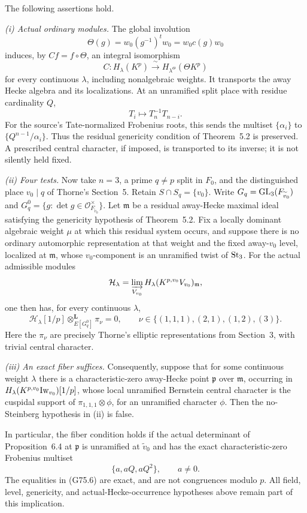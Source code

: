 \begin{theorem}
\label{thm:G75}
The following assertions hold.

\emph{(i) Actual ordinary modules.}
The global involution
\[
 \Theta(g)=w_0(g^{-1})^t w_0=w_0c(g)w_0
 \tag{G75.2}
\]
induces, by \(Cf=f\circ\Theta\), an integral isomorphism
\[
 C:H_\lambda(K^p)\xrightarrow{\ \sim\ }
                H_{\lambda^\Theta}(\Theta K^p)
 \tag{G75.3}
\]
for every continuous \(\lambda\), including nonalgebraic weights.
It transports the away Hecke algebra and its localizations.
At an unramified split place with residue cardinality \(Q\),
\[
 T_i\longmapsto T_n^{-1}T_{n-i}.
 \tag{G75.4}
\]
For the source's Tate-normalized Frobenius roots, this sends the multiset
\(\{\alpha_i\}\) to \(\{Q^{n-1}/\alpha_i\}\).
Thus the residual genericity condition of Theorem~5.2 is preserved.
A prescribed central character, if imposed, is transported to its inverse;
it is not silently held fixed.

\emph{(ii) Four tests.}
Now take \(n=3\), a prime \(q\ne p\) split in \(F_0\), and the distinguished
place \(v_0\mid q\) of Thorne's Section~5.  Retain \(S\cap S_q=\{v_0\}\).
Write \(G_q={\rm GL}_3(F_{\widetilde v_0})\) and
\(G_q^0=\{g:\det g\in\mathcal O_{F_{\widetilde v_0}}^\times\}\).
Let \(\mathfrak m\) be a residual away-Hecke maximal ideal satisfying the
genericity hypothesis of Theorem~5.2.  Fix a locally dominant algebraic
weight \(\mu\) at which this residual system occurs, and suppose there is
no ordinary automorphic representation at that weight and the fixed
away-\(v_0\) level, localized at \(\mathfrak m\), whose \(v_0\)-component is an
unramified twist of \({\rm St}_3\).
For the actual admissible modules
\[
 \mathcal H_\lambda=
 \varinjlim_{V_{v_0}}H_\lambda(K^{p,v_0}V_{v_0})_{\mathfrak m},
\]
one then has, for every continuous \(\lambda\),
\[
 \mathcal H_\lambda[1/p]\otimes^{\mathbf L}_{E[G_q^0]}\pi_\nu=0,
 \qquad
 \nu\in\{(1,1,1),(2,1),(1,2),(3)\}.
 \tag{G75.5}
\]
Here the \(\pi_\nu\) are precisely Thorne's elliptic representations from
Section~3, with trivial central character.

\emph{(iii) An exact fiber suffices.}
Consequently, suppose that for some continuous weight \(\lambda\) there
is a characteristic-zero away-Hecke point \(\mathfrak p\) over
\(\mathfrak m\), occurring in
\(H_\lambda(K^{p,v_0}{\rm Iw}_{v_0})[1/p]\), whose local unramified
Bernstein central character is the cuspidal support of
\(\pi_{1,1,1}\otimes\phi\), for an unramified character \(\phi\).
Then the no-Steinberg hypothesis in (ii) is false.

In particular, the fiber condition holds if the actual determinant of
Proposition~6.4 at \(\mathfrak p\) is unramified at \(\widetilde v_0\) and
has the exact characteristic-zero Frobenius multiset
\[
                  \{a,aQ,aQ^2\},\qquad a\ne0.
 \tag{G75.6}
\]
The equalities in (G75.6) are exact, and are not congruences modulo \(p\).
All field, level, genericity, and actual-Hecke-occurrence hypotheses
above remain part of this implication.
\end{theorem}


